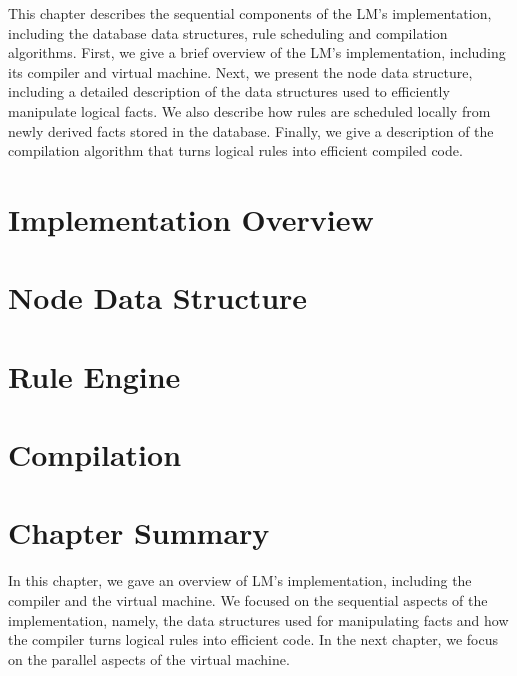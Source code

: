 
This chapter describes the sequential components of the LM's implementation,
including the database data structures, rule scheduling and compilation
algorithms. First, we give a brief overview of the LM's implementation,
including its compiler and virtual machine. Next, we present the node data
structure, including a detailed description of the data structures used to
efficiently manipulate logical facts. We also describe how rules are scheduled
locally from newly derived facts stored in the database.  Finally, we give a
description of the compilation algorithm that turns logical rules into efficient
compiled code.

\section{Implementation Overview}


\section{Node Data Structure}\label{sec:data_structures}


\section{Rule Engine}\label{section:local:rule_engine}\label{sec:implementation:rule_engine}


\section{Compilation}


\section{Chapter Summary}

In this chapter, we gave an overview of LM's implementation, including the
compiler and the virtual machine. We focused on the sequential aspects of the
implementation, namely, the data structures used for manipulating facts and how
the compiler turns logical rules into efficient code. In the next chapter, we
focus on the parallel aspects of the virtual machine.
